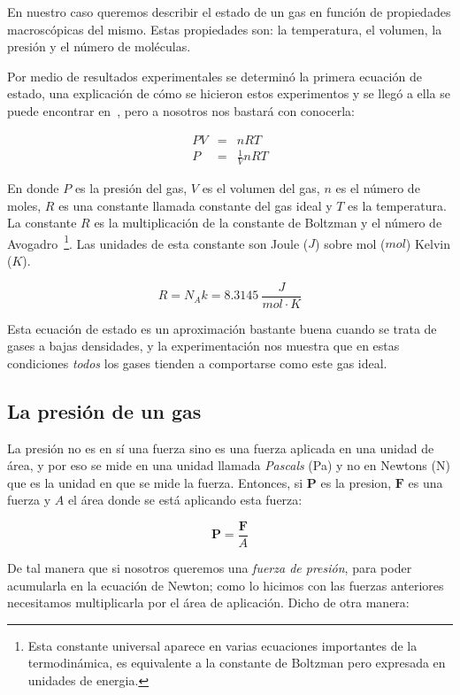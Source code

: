 En nuestro caso queremos describir el estado de un gas en función de propiedades macroscópicas del mismo.
Estas propiedades son: la temperatura, el volumen, la presión y el número de moléculas.

Por medio de resultados experimentales se determinó la primera ecuación de estado, una explicación de cómo se hicieron estos experimentos y se llegó a ella se puede encontrar en~\cite{Resnick:Fisica}, pero a nosotros nos bastará con conocerla:

\begin{eqnarray}
PV & = & nRT \nonumber \\
P & = & \frac{1}{V}nRT
\end{eqnarray}

En donde $P$ es la presión del gas, $V$ es el volumen del gas, $n$ es el número de moles, $R$ es una constante llamada constante del gas ideal y $T$ es la temperatura.
La constante $R$ es la multiplicación de la constante de Boltzman y el número de Avogadro~\footnote{Esta constante universal aparece en varias ecuaciones importantes de la termodinámica, es equivalente a la constante de Boltzman pero expresada en unidades de energia.}.
Las unidades de esta constante son Joule ($J$) sobre mol ($mol$) Kelvin ($K$).

$$ R = N_A k = 8.3145 \ \frac{J}{mol \cdot K}$$

Esta ecuación de estado es un aproximación bastante buena cuando se trata de gases a bajas densidades, y la experimentación nos muestra que en estas condiciones \emph{todos} los gases tienden a comportarse como este gas ideal.

\subsection{La presión de un gas}

La presión no es en sí una fuerza sino es una fuerza aplicada en una unidad de área, y por eso se mide en una unidad llamada \emph{Pascals} (Pa) y no en Newtons (N) que es la unidad en que se mide la fuerza.
Entonces, si $\textbf{P}$ es la presion, $\textbf{F}$ es una fuerza y $A$ el área donde se está aplicando esta fuerza:

$$ \textbf{P} = \frac{\textbf{F}}{A} $$

De tal manera que si nosotros queremos una \emph{fuerza de presión}, para poder acumularla en la ecuación de Newton; como lo hicimos con las fuerzas anteriores necesitamos multiplicarla por el área de aplicación.
Dicho de otra manera:

